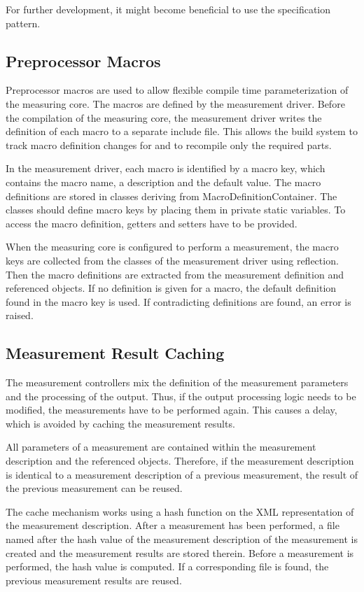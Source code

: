 \documentclass[a4paper,12pt]{report}
\newlength{\imgwidth}
\newcommand{\umlDiagram}[1]{%
	\settowidth{\imgwidth}{\texttt{[image: out/diagrams/\#1.pdf]}}%
	\setlength{\imgwidth}{\minof{0.5\imgwidth}{\textwidth}}%
	\par\vskip0.5cm\noindent\makebox[\textwidth][c]{%
	\texttt{[image: out/diagrams/\#1.pdf]}%
}\vskip0.5cm}
\begin{document}
For further development, it might become beneficial to use the specification
pattern. 

\subsection{Preprocessor Macros}
Preprocessor macros are used to allow flexible compile time parameterization of
the measuring core. The macros are defined by the measurement driver. Before the
compilation of the measuring core, the measurement driver writes the definition
of each macro to a separate include file. This allows the build system to track
macro definition changes for and to recompile only the required parts.

In the measurement driver, each macro is identified by a macro key, which
contains the macro name, a description and the default value. The macro
definitions are stored in classes deriving from MacroDefinitionContainer. The
classes should define macro keys by placing them in private static variables. To
access the macro definition, getters and setters have to be provided. 

When the measuring core is configured to perform a measurement, the macro keys
are collected from the classes of the measurement driver using reflection. Then
the macro definitions are extracted from the measurement definition and
referenced objects. If no definition is given for a macro, the default
definition found in the macro key is used. If contradicting definitions are
found, an error is raised.

\umlDiagram{measurementDriver/MacroDefinitions}

\subsection{Measurement Result Caching}
The measurement controllers mix the definition of the measurement parameters and
the processing of the output. Thus, if the output processing logic needs to be
modified, the measurements have to be performed again. This causes a delay,
which is avoided by caching the measurement results. 

All parameters of a measurement are contained within the measurement description
and the referenced objects. Therefore, if the measurement description is
identical to a measurement description of a previous measurement, the result of
the previous measurement can be reused. 

The cache mechanism works using a hash function on the XML representation of the
measurement description. After a measurement has been performed, a file named
after the hash value of the measurement description of the measurement is created
and the measurement results are stored therein. Before a measurement is
performed, the hash value is computed. If a corresponding file is found, the
previous measurement results are reused.
\end{document}
